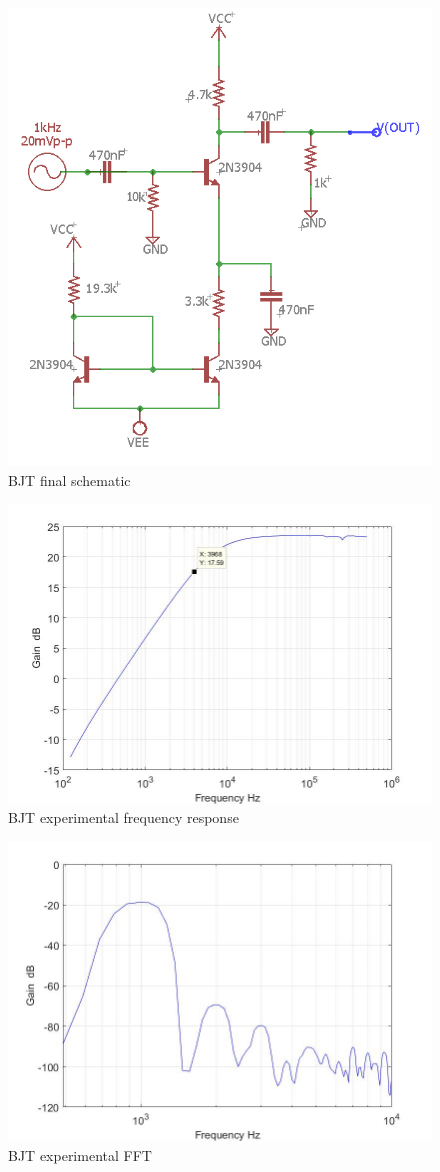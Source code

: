 \begin{figure}[H]
	\centering
	\includegraphics[width=0.7\linewidth]{ExperimentalImplementation/BJT_Exp}
	\caption{BJT final schematic}
	\label{fig:bjtexp}
\end{figure}



\begin{figure}[H]
	\centering
	\includegraphics[width=0.7\linewidth]{ExperimentalImplementation/bjt_outputexp.jpg}
	\caption{BJT experimental frequency response}
	\label{fig:bjtexpfreq}
\end{figure}


\begin{figure}[H]
	\centering
	\includegraphics[width=0.7\linewidth]{ExperimentalImplementation/bjt_fft.jpg}
	\caption{BJT experimental FFT}
	\label{fig:bjtexpfft}
\end{figure}




